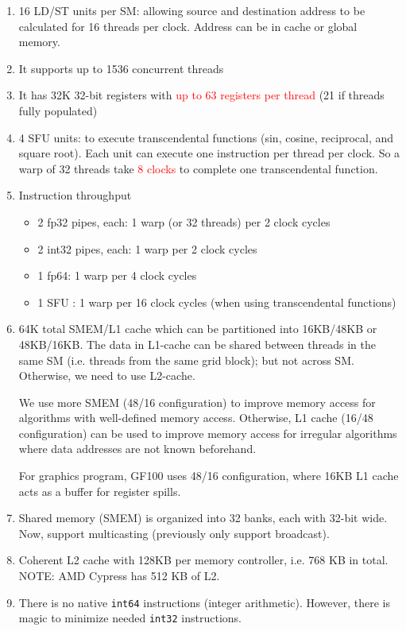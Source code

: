\begin{enumerate}
  \item 16 LD/ST units per SM: allowing source and destination address to be
  calculated for 16 threads per clock. Address can be in cache or global memory.
  
\item It supports up to 1536 concurrent threads
\item It has 32K 32-bit registers with \textcolor{red}{up to 63
    registers per thread} (21 if threads fully populated)

\item 4 SFU units: to execute transcendental functions (sin, cosine, reciprocal, and
square root). Each unit can execute one instruction per thread per clock. So a
warp of 32 threads take \textcolor{red}{8 clocks} to complete one transcendental
function.

\item Instruction throughput
  \begin{itemize}
  \item 2 fp32 pipes, each: 1 warp (or 32 threads) per 2 clock cycles
  \item 2 int32 pipes, each: 1 warp per 2 clock cycles
  \item 1 fp64: 1 warp per 4 clock cycles
  \item 1 SFU : 1 warp per 16 clock cycles (when using transcendental
    functions) 
  \end{itemize}

\item 64K total SMEM/L1 cache which can be partitioned into 16KB/48KB or
  48KB/16KB. The data in L1-cache can be shared between threads in the same SM
  (i.e. threads from the same grid block); but not across SM. Otherwise, we need
  to use L2-cache.

\begin{framed}

   We use more SMEM (48/16 configuration) to improve memory access for
   algorithms with well-defined memory access. Otherwise, L1 cache (16/48
   configuration) can be used to improve memory access for irregular algorithms
   where data addresses are not known beforehand.
   
   For graphics program, GF100 uses 48/16 configuration, where 16KB L1 cache
   acts as a buffer for register spills.
\end{framed} 

\item Shared memory (SMEM) is organized into 32 banks, each with
  32-bit wide. Now, support multicasting (previously only support
  broadcast). 

\item Coherent L2 cache with 128KB per memory controller, i.e. 768 KB
  in total. NOTE: AMD Cypress has 512 KB of L2. 

\item There is no native \verb!int64! instructions (integer
  arithmetic). However, there is magic to minimize needed \verb!int32!
  instructions. 
\end{enumerate}


